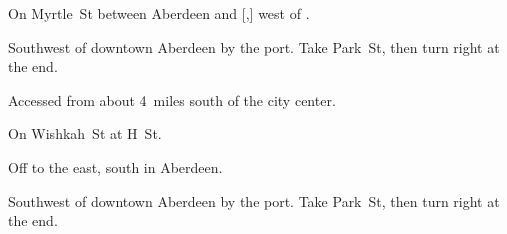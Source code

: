 
\begin{LocationList}

On Myrtle~St between Aberdeen and [,] west of .

Southwest of downtown Aberdeen by the port.
Take Park~St, then turn right at the end.

Accessed from  about 4~miles south of the city center.

On Wishkah~St at H~St.

Off  to the east, south in Aberdeen.

Southwest of downtown Aberdeen by the port.
Take Park~St, then turn right at the end.

\end{LocationList}

